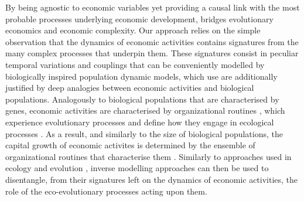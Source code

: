 By being agnostic to economic variables yet providing a causal link with the most probable processes underlying economic development, \chapiii bridges evolutionary economics and economic complexity.
% 
Our approach relies on the simple observation that the dynamics of economic activities contains signatures from the many complex processes that underpin them.
% 
These signatures consist in peculiar temporal variations and couplings that can be conveniently modelled by biologically inspired population dynamic models, which use are additionally justified by deep analogies between economic activities and biological populations. 
% 
Analogously to biological populations that are characterised by genes, economic activities are characterised by organizational routines \cite{NelsonWinter}, which experience evolutionary processes and define how they engage in ecological processes \cite{NelsonWinter}.
% 
% 
As a result, and similarly to the size of biological populations, the capital growth of economic activites is determined by the ensemble of organizational routines that characterise them \cite{Boschma2005a}.
% 
Similarly to approaches used in ecology and evolution \cite{Skeels}, inverse modelling approaches can then be used to disentangle, from their signatures \cite{Skeels} left on the dynamics of economic activities, the role of the eco-evolutionary processes acting upon them.

